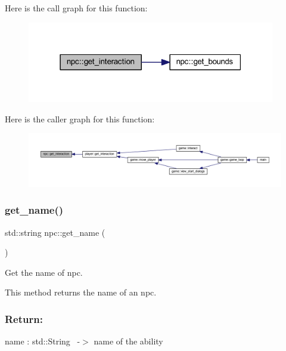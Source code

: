 Here is the call graph for this function\+:
\nopagebreak
\begin{figure}[H]
\begin{center}
\leavevmode
\includegraphics[width=307pt]{classnpc_a2714b410c2e644040f69f1cf50d3bc50_cgraph}
\end{center}
\end{figure}
Here is the caller graph for this function\+:
\nopagebreak
\begin{figure}[H]
\begin{center}
\leavevmode
\includegraphics[width=350pt]{classnpc_a2714b410c2e644040f69f1cf50d3bc50_icgraph}
\end{center}
\end{figure}
\mbox{\label{classnpc_a670b40abcf52e0615883622324ac3bc9}} 
\subsubsection{\texorpdfstring{get\+\_\+name()}{get\_name()}}
{\footnotesize\ttfamily std\+::string npc\+::get\+\_\+name (\begin{DoxyParamCaption}{ }\end{DoxyParamCaption})}



Get the name of npc. 

This method returns the name of an npc.~\newline


\subsubsection*{Return\+: }

name \+: std\+::\+String~\newline
-\/$>$ name of the ability


